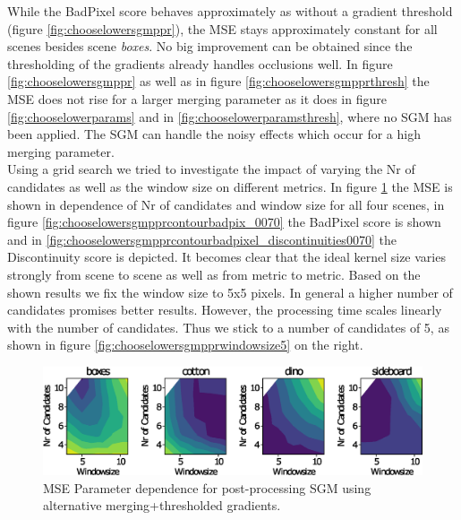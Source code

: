 \documentclass  [
  paper    = a4,
  BCOR     = 10mm,
  twoside,
  fontsize = 12pt,
  fleqn,
  toc      = bibnumbered,
  toc      = listofnumbered,
  numbers  = noendperiod,
  headings = normal,
  listof   = leveldown,
  version  = 3.03
]                                       {scrreprt}
\begin{document}
While the BadPixel score behaves approximately as without a gradient threshold (figure \ref{fig:chooselowersgmppr}), the MSE stays approximately constant for all scenes besides scene \textit{boxes}. No big improvement can be obtained since the thresholding of the gradients already handles occlusions well. 
In figure \ref{fig:chooselowersgmppr} as well as in figure \ref{fig:chooselowersgmpprthresh} the MSE does not rise for a larger merging parameter as it does in figure \ref{fig:chooselowerparams} and in \ref{fig:chooselowerparamsthresh}, where no SGM has been applied. The SGM can handle the noisy effects which occur for a high merging parameter.
\ \\
Using a grid search we tried to investigate the impact of varying the Nr of candidates as well as the window size on different metrics. In figure \ref{fig:chooselowersgmpprcontourmse100} the MSE is shown in dependence of Nr of candidates and window size for all four scenes, in figure \ref{fig:chooselowersgmpprcontourbadpix_0070} the BadPixel score is shown and in \ref{fig:chooselowersgmpprcontourbadpixel_discontinuities0070} the Discontinuity score is depicted. It becomes clear that the ideal kernel size varies strongly from scene to scene as well as from metric to metric. Based on the shown results we fix the window size to 5x5 pixels. In general a higher number of candidates promises better results. However, the processing time scales linearly with the number of candidates. Thus we stick to a number of candidates of 5, as shown in figure \ref{fig:chooselowersgmpprwindowsize5} on the right.
\begin{figure}[h!]
	\centering
	\includegraphics[width=1\linewidth]{images/choose_lower_sgm_ppr_contour_mse_100}
	\caption[Parameter dependence for post-processing SGM using alternative merging+thresholded gradients.]{MSE Parameter dependence for post-processing SGM using alternative merging+thresholded gradients.}
	\label{fig:chooselowersgmpprcontourmse100}
\end{figure}
\end{document}
